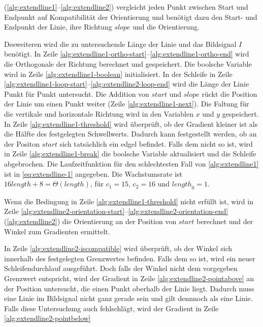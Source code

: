  (\autoref{alg:extendline1}--\autoref{alg:extendline2}) vergleicht jeden Punkt zwischen Start und
 Endpunkt auf Kompatibilität der Orientierung und benötigt dazu den Start- und Endpunkt der Linie, ihre Richtung
 $\mathit{slope}$ und die Orientierung.

Desweiteren wird die zu untersuchende Länge der Linie und das Bildsignal $I$ benötigt. In Zeile
 \ref{alg:extendline1-ortho-start}--\ref{alg:extendline1-ortho-end} wird die Orthogonale der Richtung berechnet und
 gespeichert. Die boolsche Variable wird in Zeile \ref{alg:extendline1-boolean} initialisiert. In der Schleife in Zeile
 \ref{alg:extendline1-loop-start}--\ref{alg:extendline2-loop-end} wird die Länge der Linie Punkt für Punkt untersucht.
 Die Addition von $\mathit{start}$ und $\mathit{slope}$ rückt die Position der Linie um einen Punkt weiter (Zeile
 \ref{alg:extendline1-next}). Die Faltung für die vertikale und horizontale Richtung wird in den Variablen $x$ und $y$
 gespeichert. In Zeile \ref{alg:extendline1-threshold} wird überprüft, ob der Gradient kleiner ist als die Hälfte des
 festgelegten Schwellwerts. Dadurch kann festgestellt werden, ob an der Positon $\mathit{start}$ sich tatsächlich ein
 \gls{edgel} befindet. Falls dem nicht so ist, wird in Zeile \ref{alg:extendline1-break} die boolsche Variable
 aktualisiert und die Schleife abgebrochen. Die Laufzeitfunktion für den schlechtesten Fall von
 \autoref{alg:extendline1} ist in \autoref{eq:extendline-1} angegeben. Die Wachstumsrate ist
 $16\mathit{length} + 8 = \Theta(length)$, für $c_{1} = 15$, $c_{2} = 16$ und $\mathit{length}_{0} = 1$.

Wenn die Bedingung in Zeile \ref{alg:extendline1-threshold} nicht erfüllt ist, wird in Zeile
 \ref{alg:extendline2-orientation-start}--\ref{alg:extendline2-orientation-end} (\autoref{alg:extendline2}) die
 Orientierung an der Position von $\mathit{start}$ berechnet und der Winkel zum Gradienten ermittelt.

In Zeile \ref{alg:extendline2-iscompatible} wird überprüft, ob der Winkel sich innerhalb des festgelegten Grenzwertes
 befinden. Falls dem so ist, wird ein neuer Schleifendurchlauf ausgeführt. Doch falls der Winkel nicht dem vorgegeben
 Grenzwert entspricht, wird der Gradient in Zeile \ref{alg:extendline2-pointabove} an der Position untersucht, die
 einen Punkt oberhalb der Linie liegt. Dadurch muss eine Linie im Bildsignal nicht ganz gerade sein und gilt dennnoch
 als eine Linie. Falls diese Untersuchung auch fehlschlägt, wird der Gradient in Zeile \ref{alg:extendline2-pointbelow}
